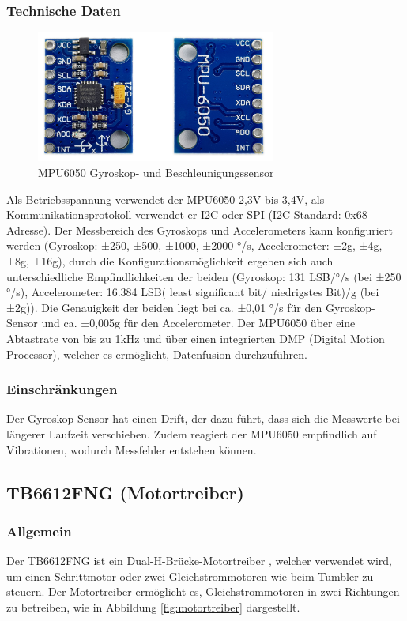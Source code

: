 \subsubsection{Technische Daten}
\begin{figure}[H]
    \centering
    \includegraphics[width=0.7\textwidth]{img/Hardware/MPU6050.png}
    \caption{MPU6050 Gyroskop- und Beschleunigungssensor}
    \label{fig:mpu6050}
\end{figure}
Als Betriebsspannung verwendet der MPU6050 2,3V bis 3,4V,
als Kommunikationsprotokoll verwendet er I2C oder SPI (I2C Standard: 0x68 Adresse).
%
Der Messbereich des Gyroskops und Accelerometers kann konfiguriert werden
(Gyroskop:  ±250, ±500, ±1000, ±2000 °/s, Accelerometer: ±2g, ±4g, ±8g, ±16g),
durch die Konfigurationsmöglichkeit ergeben sich auch unterschiedliche Empfindlichkeiten der beiden
(Gyroskop: 131 LSB/°/s (bei ±250 °/s),
Accelerometer: 16.384 LSB( least significant bit/ niedrigstes Bit)/g (bei ±2g)).
%
Die Genauigkeit der beiden liegt bei ca. ±0,01 °/s für den Gyroskop-Sensor und ca. ±0,005g für den Accelerometer.
%
Der MPU6050 über eine Abtastrate von bis zu 1kHz und über einen integrierten DMP (Digital Motion Processor),
welcher es ermöglicht, Datenfusion durchzuführen.
%
\subsubsection{Einschränkungen}
Der Gyroskop-Sensor hat einen Drift,
der dazu führt, dass sich die Messwerte bei längerer Laufzeit verschieben.
%
Zudem reagiert der MPU6050 empfindlich auf Vibrationen,
wodurch Messfehler entstehen können.
%
\subsection{TB6612FNG (Motortreiber)}
%
\subsubsection{Allgemein}
Der TB6612FNG ist ein Dual-H-Brücke-Motortreiber  \cite{toshiba-tb6612fng},
welcher verwendet wird,
um einen Schrittmotor oder zwei Gleichstrommotoren wie beim Tumbler zu steuern.
%
Der Motortreiber ermöglicht es,
Gleichstrommotoren in zwei Richtungen zu betreiben,
wie in Abbildung \ref{fig:motortreiber} dargestellt.
%
